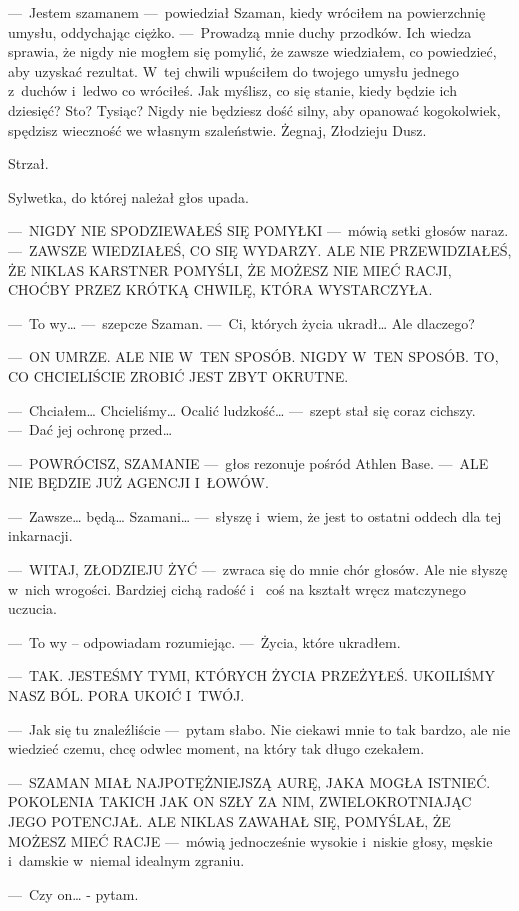 ---~Jestem szamanem ---~powiedział Szaman, kiedy wróciłem na powierzchnię umysłu, oddychając ciężko. ---~Prowadzą 
mnie duchy przodków. Ich wiedza sprawia, że nigdy nie mogłem się pomylić, że zawsze wiedziałem, co powiedzieć, aby 
uzyskać rezultat. W~tej chwili wpuściłem do twojego umysłu jednego z~duchów i~ledwo co wróciłeś. Jak myślisz, co się 
stanie, kiedy będzie ich dziesięć? Sto? Tysiąc? Nigdy nie będziesz dość silny, aby opanować kogokolwiek, spędzisz 
wieczność we własnym szaleństwie. Żegnaj, Złodzieju Dusz.

Strzał.

Sylwetka, do której należał głos upada.

---~NIGDY NIE SPODZIEWAŁEŚ SIĘ POMYŁKI ---~mówią setki głosów naraz. ---~ZAWSZE WIEDZIAŁEŚ, CO SIĘ WYDARZY. ALE NIE 
PRZEWIDZIAŁEŚ, ŻE NIKLAS KARSTNER POMYŚLI, ŻE MOŻESZ NIE MIEĆ RACJI, CHOĆBY PRZEZ KRÓTKĄ CHWILĘ, KTÓRA WYSTARCZYŁA.

---~To wy… ---~szepcze Szaman. ---~Ci, których życia ukradł… Ale dlaczego?

---~ON UMRZE. ALE NIE W~TEN SPOSÓB. NIGDY W~TEN SPOSÓB. TO, CO CHCIELIŚCIE ZROBIĆ JEST ZBYT OKRUTNE.

---~Chciałem… Chcieliśmy… Ocalić ludzkość… ---~szept stał się coraz cichszy. ---~Dać jej ochronę przed…

---~POWRÓCISZ, SZAMANIE ---~głos rezonuje pośród Athlen Base. ---~ALE NIE BĘDZIE JUŻ AGENCJI I~ŁOWÓW.

---~Zawsze… będą… Szamani… ---~słyszę i~wiem, że jest to ostatni oddech dla tej inkarnacji.

---~WITAJ, ZŁODZIEJU ŻYĆ ---~zwraca się do mnie chór głosów. Ale nie słyszę w~nich wrogości. Bardziej cichą radość i~
coś na kształt wręcz matczynego uczucia.

---~To wy – odpowiadam rozumiejąc. ---~Życia, które ukradłem.

---~TAK. JESTEŚMY TYMI, KTÓRYCH ŻYCIA PRZEŻYŁEŚ. UKOILIŚMY NASZ BÓL. PORA UKOIĆ I~TWÓJ.

---~Jak się tu znaleźliście ---~pytam słabo. Nie ciekawi mnie to tak bardzo, ale nie wiedzieć czemu, chcę odwlec 
moment, na który tak długo czekałem.

---~SZAMAN MIAŁ NAJPOTĘŻNIEJSZĄ AURĘ, JAKA MOGŁA ISTNIEĆ. POKOLENIA TAKICH JAK ON SZŁY ZA NIM, ZWIELOKROTNIAJĄC JEGO 
POTENCJAŁ. ALE NIKLAS ZAWAHAŁ SIĘ, POMYŚLAŁ, ŻE MOŻESZ MIEĆ RACJE ---~mówią jednocześnie wysokie i~niskie głosy, 
męskie i~damskie w~niemal idealnym zgraniu.

---~Czy on… - pytam.


